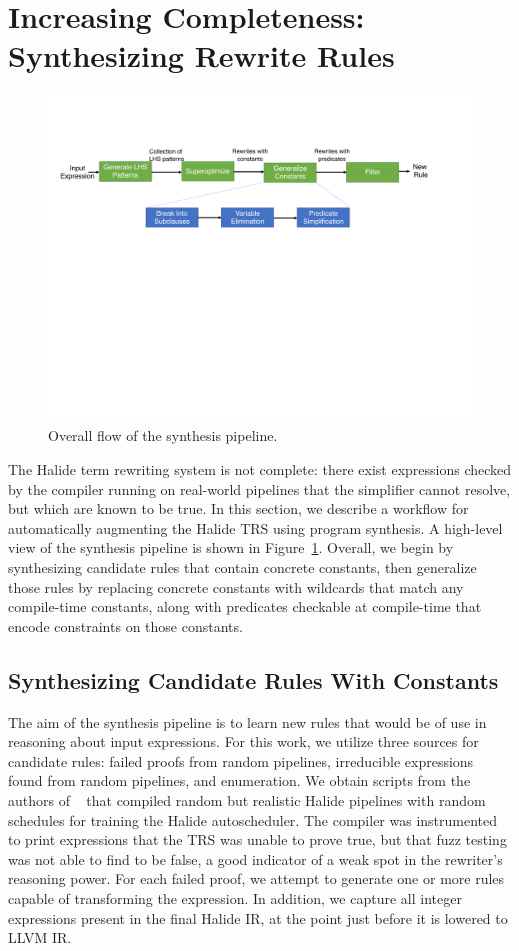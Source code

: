 \documentclass[sigplan,10pt,review,anonymous]{acmart}\settopmatter{printfolios=true,printccs=false,printacmref=false}
\begin{document}
\section{Increasing Completeness: Synthesizing Rewrite Rules}
\begin{figure}
\includegraphics[width=1.9\columnwidth]{figures/synthesis-flow.pdf}
\caption{Overall flow of the synthesis pipeline.}
\label{fig:synthesis-flow}
\end{figure}


The Halide term rewriting system is not complete: there
exist expressions checked by the compiler running on real-world pipelines that
the simplifier cannot resolve, but which are known to be true. 
In this section, we describe a workflow for automatically augmenting the Halide
TRS using program synthesis.
A high-level view of the synthesis pipeline is shown in Figure~\ref{fig:synthesis-flow}.
Overall, we begin by synthesizing candidate rules that contain concrete constants,
then generalize those rules by replacing concrete constants with wildcards that
match any compile-time constants, along with predicates checkable at compile-time
that encode constraints on those constants.

\subsection{Synthesizing Candidate Rules With Constants}
The aim of the synthesis pipeline is to learn new rules that would be of use in reasoning about input expressions.
For this work, we utilize three sources for candidate rules: failed proofs from
random pipelines, irreducible expressions found from random pipelines, and enumeration.
We obtain scripts from the authors of \citeauthor{Adams2019}~\cite{Adams2019} that compiled
 random but realistic Halide pipelines with random schedules for
training the Halide autoscheduler. The compiler was instrumented to print
expressions that the TRS was unable to prove true, but that fuzz
testing was not able to find to be false, a good indicator of a weak spot in the
rewriter's reasoning power. For each failed proof, we attempt to generate one
or more rules capable of transforming the expression. In addition, we capture all
integer expressions present in the final Halide IR, at the point just before it is
lowered to LLVM IR.
\end{document}
